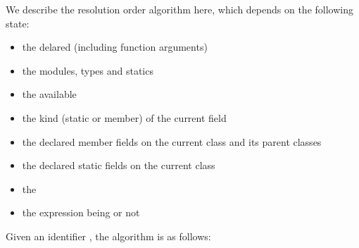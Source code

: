 \documentclass{haxe}
\begin{document}
We describe the resolution order algorithm here, which depends on the following state:

\begin{itemize}
	\item the delared  (including function arguments)
	\item the  modules, types and statics
	\item the available 
	\item the kind (static or member) of the current field
	\item the declared member fields on the current class and its parent classes
	\item the declared static fields on the current class
	\item the 
	\item the expression being  or not
\end{itemize}




Given an identifier , the algorithm is as follows:
\end{document}
